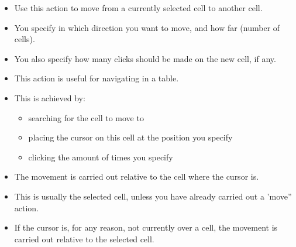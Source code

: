 %
\begin{itemize}
\item Use this action to move from a currently selected cell to another cell.
\item You specify in which direction you want to move, and how far (number of cells).
\item You also specify how many clicks should be made on the new cell, if any.
\item This action is useful for navigating in a table.
\item This is achieved by:
\begin{itemize}
\item searching for the cell to move to
\item placing the cursor on this cell at the position you specify
\item clicking the amount of times you specify
\end{itemize}
\item The movement is carried out relative to the cell where the cursor is. 
\item This is usually the selected cell, unless you have already carried out a 'move'' action. 
\item If the cursor is, for any reason, not currently over a cell, the movement is carried out relative to the selected cell. 
\end{itemize}

